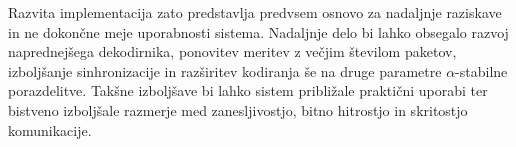\documentclass[a4paper, 12pt, openany]{book}
\begin{document}
Razvita implementacija zato predstavlja predvsem osnovo za nadaljnje raziskave in ne dokončne meje uporabnosti sistema. Nadaljnje delo bi lahko obsegalo razvoj naprednejšega dekodirnika, ponovitev meritev z večjim številom paketov, izboljšanje sinhronizacije in razširitev kodiranja še na druge parametre $\alpha$-stabilne porazdelitve. Takšne izboljšave bi lahko sistem približale praktični uporabi ter bistveno izboljšale razmerje med zanesljivostjo, bitno hitrostjo in skritostjo komunikacije.


\cleardoublepage
{}
\nocite{*}


\end{document}

